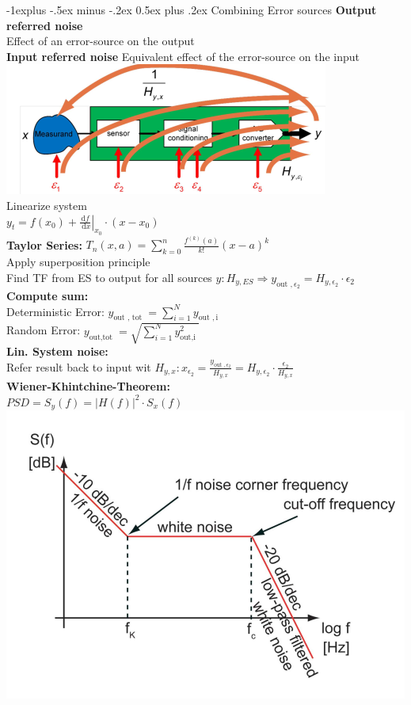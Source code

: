 \documentclass[5pt]{article}
\makeatletter
\renewcommand{\subsection}{\@startsection{subsection}{2}{0mm}%
                                {-1explus -.5ex minus -.2ex}%
                                {0.5ex plus .2ex}%
                                {\normalfont\normalsize\bfseries}}
\makeatother
\begin{document}
\begin{multicols*}{4}
\subsection{Combining Error sources}
\textbf{Output referred noise}\\
Effect of an error-source on the output\\
\textbf{Input referred noise}
Equivalent effect of the error-source on the input\\
\includegraphics[width = \columnwidth]{images/error_referral.png}\\
Linearize system\\
$ y_{t}=f\left(x_{0}\right)+\left.\frac{\mathrm{d} f}{\mathrm{~d} x}\right|_{x_{0}} \cdot\left(x-x_{0}\right) $\\
\textbf{Taylor Series:} $T_n(x, a)= \sum_{k=0}^{n}\frac{f^{(k)}(a)}{k!}(x-a)^{k}$\\
Apply superposition principle\\
Find TF from ES to output for all sources $ y:H_{y,ES} \Rightarrow y_{\text {out }, \epsilon_{2}}=H_{y, \epsilon_{2}} \cdot \epsilon_{2}$\\
\textbf{Compute sum:}\\
Deterministic Error: $ y_{\text {out }, \text { tot }}=\sum_{i=1}^{N} y_{\text {out }, \mathrm{i}} $\\
Random Error: $ y_{\text {out,tot }}=\sqrt{\sum_{i=1}^{N} y_{\text {out,i }}^{2}} $\\
\textbf{Lin. System noise:}\\
Refer result back to input wit $ H_{y,x}: x_{\epsilon_{2}}=\frac{y_{\text {out }, \epsilon_{2}}}{H_{y, x}}=H_{y, \epsilon_{2}} \cdot \frac{\epsilon_{2}}{H_{y, x}} $\\
\textbf{Wiener-Khintchine-Theorem:}\\
$ PSD =  S_{y}(f)=|H(f)|^{2} \cdot S_{x}(f)$
\includegraphics[width = 0.8\columnwidth]{images/noise_bode.png}

\end{multicols*}
\end{document}
